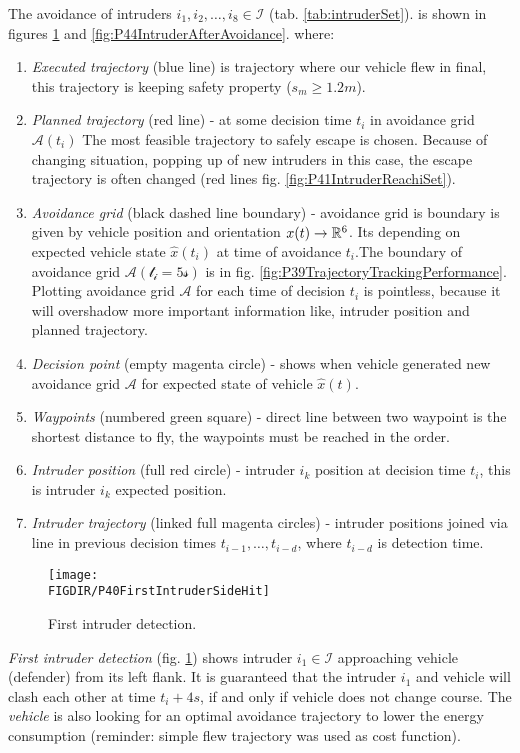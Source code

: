 \noindent The avoidance of intruders $i_1,i_2,\dots,i_8\in\mathscr{I}$ (tab. \ref{tab:intruderSet}). is shown in figures \ref{fig:P40FirstIntruderSideHit} and \ref{fig:P44IntruderAfterAvoidance}. where:
\begin{enumerate}
    \item\emph{Executed trajectory} (blue line) is trajectory where our vehicle flew in final, this trajectory is keeping safety property ($s_m \ge 1.2m$).
    \item\emph{Planned trajectory} (red line) - at some decision time $t_i$ in avoidance grid $\mathscr{A}(t_i)$ The most feasible trajectory to safely escape is chosen. Because of changing situation, popping up of new intruders in this case, the escape trajectory is often changed (red lines fig. \ref{fig:P41IntruderReachiSet}).
    \item\emph{Avoidance grid} (black dashed line boundary) - avoidance grid is boundary is given by vehicle position and orientation $x(t)\to \mathbb{R}^6$. Its depending on expected vehicle state $\hat{x}(t_i)$ at time of avoidance $t_i$.The boundary of avoidance grid $\mathscr{A(t_i=5s)}$ is in fig. \ref{fig:P39TrajectoryTrackingPerformance}. Plotting avoidance grid $\mathscr{A}$ for each time of decision $t_i$ is pointless, because it will overshadow more important information like, intruder position and planned trajectory.
    \item\emph{Decision point} (empty magenta circle) - shows when vehicle generated new avoidance grid $\mathscr{A}$ for expected state of vehicle $\hat{x}(t)$.
    \item\emph{Waypoints} (numbered green square) - direct line between two waypoint is the shortest distance to fly, the waypoints must be reached in the order.
    \item\emph{Intruder position} (full red circle) - intruder $i_k$ position at decision time $t_i$, this is intruder $i_k$ expected position. 
    \item\emph{Intruder trajectory} (linked full magenta circles) - intruder positions joined via line in previous decision times $t_{i-1},\dots,t_{i-d}$, where $t_{i-d}$ is detection time. 
\end{enumerate}
\begin{figure}[H]
    \centering
    \texttt{[image: \\FIGDIR/P40FirstIntruderSideHit]}
    \caption{First intruder detection.}
    \label{fig:P40FirstIntruderSideHit}
\end{figure}

\noindent\emph{First intruder detection} (fig. \ref{fig:P40FirstIntruderSideHit}) shows intruder $i_1\in\mathscr{I}$ approaching vehicle (defender) from its left flank. It is guaranteed that the intruder $i_1$ and vehicle will clash each other at time $t_i+4s$, if and only if vehicle does not change course. The \emph{vehicle} is also looking for an optimal avoidance trajectory to lower the energy consumption (reminder: simple flew trajectory was used as cost function). 

